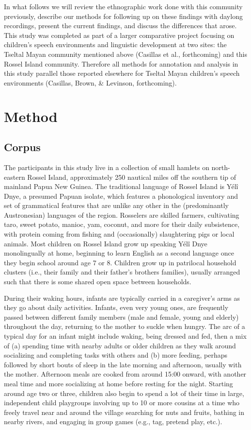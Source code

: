 \documentclass[,man,floatsintext]{apa6}
\begin{document}
In what follows we will review the ethnographic work done with this
community previously, describe our methods for following up on these
findings with daylong recordings, present the current findings, and
discuss the differences that arose. This study was completed as part of
a larger comparative project focusing on children's speech environments
and linguistic development at two sites: the Tseltal Mayan community
mentioned above (Casillas et al., forthcoming) and this Rossel Island
community. Therefore all methods for annotation and analysis in this
study parallel those reported elsewhere for Tseltal Mayan children's
speech environments (Casillas, Brown, \& Levinson, forthcoming).

\section{Method}\label{methods}

\subsection{Corpus}\label{methods-dataset}

The participants in this study live in a collection of small hamlets on
north-eastern Rossel Island, approximately 250 nautical miles off the
southern tip of mainland Papua New Guinea. The traditional language of
Rossel Island is Yélî Dnye, a presumed Papuan isolate, which features a
phonological inventory and set of grammatical features that are unlike
any other in the (predominantly Austronesian) languages of the region.
Rosselers are skilled farmers, cultivating taro, sweet potato, manioc,
yam, coconut, and more for their daily subsistence, with protein coming
from fishing and (occasionally) slaughtering pigs or local animals. Most
children on Rossel Island grow up speaking Yélî Dnye monolingually at
home, beginning to learn English as a second language once they begin
school around age 7 or 8. Children grow up in patrilocal household
clusters (i.e., their family and their father's brothers families),
usually arranged such that there is some shared open space between
households.

During their waking hours, infants are typically carried in a
caregiver's arms as they go about daily activities. Infants, even very
young ones, are frequently passed between different family members (male
and female, young and elderly) throughout the day, returning to the
mother to suckle when hungry. The arc of a typical day for an infant
might include waking, being dressed and fed, then a mix of (a) spending
time with nearby adults or older children as they walk around
socializing and completing tasks with others and (b) more feeding,
perhaps followed by short bouts of sleep in the late morning and
afternoon, usually with the mother. Afternoon meals are cooked from
around 15:00 onward, with another meal time and more socializing at home
before resting for the night. Starting around age two or three, children
also begin to spend a lot of their time in large, independent child
playgroups involving up to 10 or more cousins at a time who freely
travel near and around the village searching for nuts and fruits,
bathing in nearby rivers, and engaging in group games (e.g., tag,
pretend play, etc.).
\end{document}

